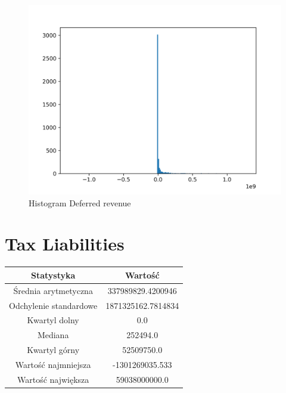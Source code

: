 \documentclass{article}
\begin{document}
\begin{figure}[h!]
    \includegraphics[width=\linewidth]{variables/Deferred revenue.png}
    \caption{Histogram Deferred revenue }
\end{figure}\section{ Tax Liabilities }

\begin{center}
    \begin{tabular}{|c | c|} 
    \hline
    Statystyka & Wartość \\
    \hline\hline
    Średnia arytmetyczna & 337989829.4200946 \\ 
    \hline
    Odchylenie standardowe & 1871325162.7814834 \\
    \hline
    Kwartyl dolny & 0.0 \\
    \hline
    Mediana & 252494.0 \\
    \hline
    Kwartyl górny & 52509750.0 \\
    \hline
    Wartość najmniejsza & -1301269035.533 \\
    \hline
    Wartość największa & 59038000000.0 \\
    \hline
   \end{tabular}
\end{center}
\end{document}

